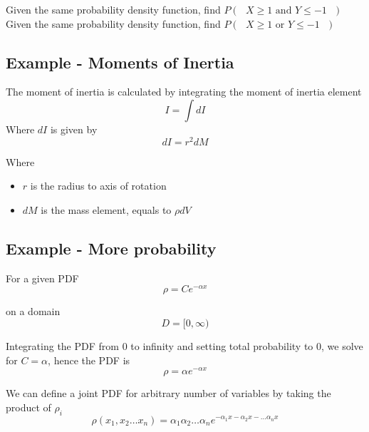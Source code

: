 Given the same probability density function, find $ P(\text{ $X \geq 1$ and $Y \leq -1$ }) $ \\

Given the same probability density function, find $ P(\text{ $X \geq 1$ or $Y \leq -1$ }) $

\subsection{Example - Moments of Inertia}

The moment of inertia is calculated by integrating the moment of inertia element
\[
   I = \int dI 
\]  Where $dI$ is given by
\[
   dI = r^2 dM
\] 

Where
 \begin{itemize}
    \item $r$ is the radius to axis of rotation
    \item $dM$ is the mass element, equals to $\rho dV$
\end{itemize}

\subsection{Example - More probability}
For a given PDF \[
   \rho = C e^{- \alpha x}
\] 

on a domain
\[
   D = [0, \infty)
\] 

Integrating the PDF from $0$ to infinity and setting total probability to 0, we solve for $C = \alpha$, hence the PDF is
\[
   \rho = \alpha e^{- \alpha x}
\] 

We can define a joint PDF for arbitrary number of variables by taking the product of $\rho_i$
\[
   \rho(x_1, x_2 \hdots x_n) = \alpha_1 \alpha_2 \hdots \alpha_n e^{- \alpha_1 x - \alpha_2 x - \hdots \alpha_n x}
\] 

